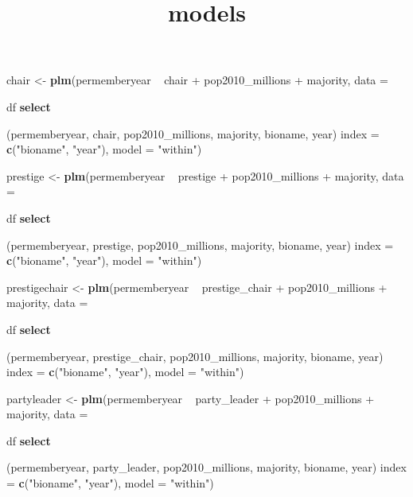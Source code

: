 \documentclass[]{article}
\title{models}
\author{}
\date{}
\newenvironment{Shaded}{\begin{snugshade}}{\end{snugshade}}
\newcommand{\KeywordTok}[1]{\textcolor[rgb]{0.13,0.29,0.53}{\textbf{{#1}}}}
\newcommand{\DataTypeTok}[1]{\textcolor[rgb]{0.13,0.29,0.53}{{#1}}}
\newcommand{\StringTok}[1]{\textcolor[rgb]{0.31,0.60,0.02}{{#1}}}
\newcommand{\NormalTok}[1]{{#1}}
\begin{document}
\maketitle

\begin{Shaded}
\begin{Highlighting}[]
\NormalTok{chair <-}\StringTok{ }\KeywordTok{plm}\NormalTok{(permemberyear ~}\StringTok{ }\NormalTok{chair +}\StringTok{ }\NormalTok{pop2010_millions +}\StringTok{ }\NormalTok{majority, }
             \DataTypeTok{data =} \NormalTok{df %
\StringTok{               }\KeywordTok{select}\NormalTok{(permemberyear, chair, pop2010_millions, majority, bioname, year) %
             \DataTypeTok{index =} \KeywordTok{c}\NormalTok{(}\StringTok{"bioname"}\NormalTok{, }\StringTok{"year"}\NormalTok{), }\DataTypeTok{model =} \StringTok{"within"}\NormalTok{)}

\NormalTok{prestige <-}\StringTok{ }\KeywordTok{plm}\NormalTok{(permemberyear ~}\StringTok{ }\NormalTok{prestige +}\StringTok{ }\NormalTok{pop2010_millions +}\StringTok{ }\NormalTok{majority, }
                \DataTypeTok{data =} \NormalTok{df %
\StringTok{                  }\KeywordTok{select}\NormalTok{(permemberyear, prestige, pop2010_millions, majority, bioname, year) %
                \DataTypeTok{index =} \KeywordTok{c}\NormalTok{(}\StringTok{"bioname"}\NormalTok{, }\StringTok{"year"}\NormalTok{), }\DataTypeTok{model =} \StringTok{"within"}\NormalTok{)}

\NormalTok{prestigechair <-}\StringTok{ }\KeywordTok{plm}\NormalTok{(permemberyear ~}\StringTok{ }\NormalTok{prestige_chair +}\StringTok{ }\NormalTok{pop2010_millions +}\StringTok{ }\NormalTok{majority,}
                     \DataTypeTok{data =} \NormalTok{df %
\StringTok{                       }\KeywordTok{select}\NormalTok{(permemberyear, prestige_chair, pop2010_millions, majority, bioname, year) %
                     \DataTypeTok{index =} \KeywordTok{c}\NormalTok{(}\StringTok{"bioname"}\NormalTok{, }\StringTok{"year"}\NormalTok{), }\DataTypeTok{model =} \StringTok{"within"}\NormalTok{)}

\NormalTok{partyleader <-}\StringTok{ }\KeywordTok{plm}\NormalTok{(permemberyear ~}\StringTok{ }\NormalTok{party_leader +}\StringTok{ }\NormalTok{pop2010_millions +}\StringTok{ }\NormalTok{majority,}
                     \DataTypeTok{data =} \NormalTok{df %
\StringTok{                       }\KeywordTok{select}\NormalTok{(permemberyear, party_leader, pop2010_millions, majority, bioname, year) %
                     \DataTypeTok{index =} \KeywordTok{c}\NormalTok{(}\StringTok{"bioname"}\NormalTok{, }\StringTok{"year"}\NormalTok{), }\DataTypeTok{model =} \StringTok{"within"}\NormalTok{)}

}}}}}}}}
\end{Highlighting}
\end{Shaded}
\end{document}
